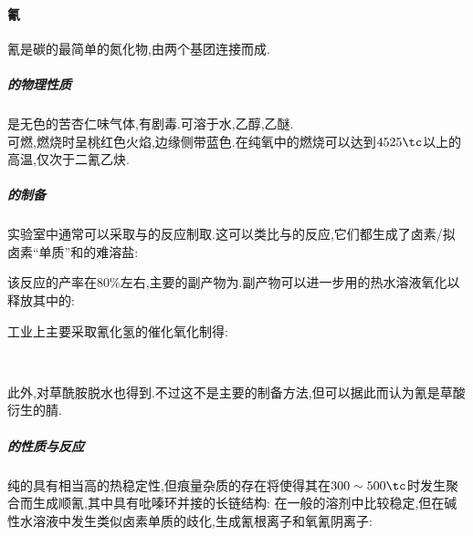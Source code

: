 \documentclass{ctexart}
\begin{document}
\paragraph{氰}
氰是碳的最简单的氮化物,由两个基团连接而成.
\subparagraph{的物理性质}
是无色的苦杏仁味气体,有剧毒.可溶于水,乙醇,乙醚.\\
\indent {}可燃,燃烧时呈桃红色火焰,边缘侧带蓝色.在纯氧中的燃烧可以达到$4525\tc$以上的高温,仅次于二氰乙炔.
\subparagraph{的制备}
实验室中通常可以采取与的反应制取.这可以类比与的反应,它们都生成了卤素/拟卤素“单质”和的难溶盐:
\begin{center}
\end{center}
该反应的产率在$80\%$左右,主要的副产物为.副产物可以进一步用的热水溶液氧化以释放其中的:
\begin{center}
\end{center}

\indent 工业上主要采取氰化氢的催化氧化制得:
\begin{center}
    \\
\end{center}

\indent 此外,对草酰胺脱水也得到.不过这不是主要的制备方法,但可以据此而认为氰是草酸衍生的腈.
\begin{center}
\end{center}
\subparagraph{的性质与反应}
纯的具有相当高的热稳定性,但痕量杂质的存在将使得其在$300\sim500\tc$时发生聚合而生成顺氰,其中具有吡嗪环并接的长链结构:
在一般的溶剂中比较稳定,但在碱性水溶液中发生类似卤素单质的歧化,生成氰根离子和氧氰阴离子:
\begin{center}
\end{center}
\end{document}
